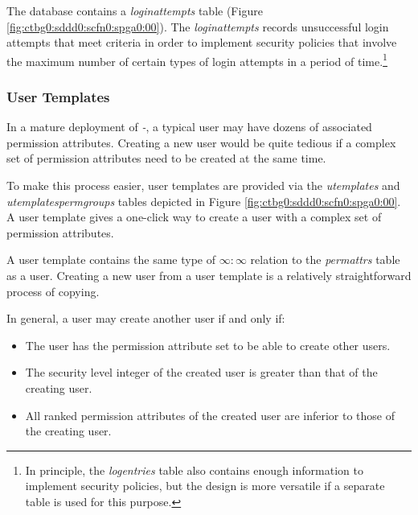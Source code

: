 The database contains a \emph{loginattempts} table
(Figure \ref{fig:ctbg0:sddd0:scfn0:spga0:00}).
The \emph{loginattempts} records unsuccessful login attempts that meet criteria
in order to implement security policies that involve the maximum number of
certain types of login attempts in a period of time.\footnote{In principle,
the \emph{logentries} table also contains enough information to implement
security policies, but the design is more versatile if a separate table
is used for this purpose.}


\subsubsection{User Templates}
\label{ctbg0:sddd0:scfn0:sutp0}

In a mature deployment of \emph{\productbasename{}-\productversion{}},
a typical user may have dozens of associated permission attributes.
Creating a new user would be quite tedious if a complex set of permission 
attributes need to be created at the same time.

To make this process easier, user templates are provided via the 
\emph{utemplates} and \emph{utemplatespermgroups} tables depicted in
Figure \ref{fig:ctbg0:sddd0:scfn0:spga0:00}.  A user template gives
a one-click way to create a user with a complex set of permission attributes.

A user template contains the same type of $\infty{}:\infty{}$
relation to the \emph{permattrs} table as a user.  Creating a new user
from a user template is a relatively straightforward process of copying.

In general, a user may create another user if and only if:

\begin{itemize}
\item The user has the permission attribute set to be able to create
      other users.
\item The security level integer of the created user is greater than that of
      the creating user.
\item All ranked permission attributes of the created user are inferior to those of
      the creating user.
\end{itemize}


